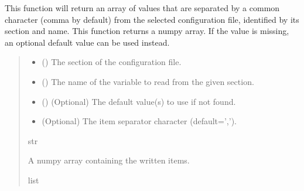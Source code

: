 \documentclass[letterpaper,10pt,english]{sphinxmanual}
\begin{document}
\begin{fulllineitems}
\begin{fulllineitems}
This function will return an array of values that are separated by a
common character (comma by default) from the selected configuration
file, identified by its section and name. This function returns a
numpy array. If the value is missing, an optional default value can
be used instead.
\begin{quote}\begin{description}
\begin{itemize}
\item {} 
\sphinxAtStartPar
{} () \textendash{} The section of the configuration file.

\item {} 
\sphinxAtStartPar
{} () \textendash{} The name of the variable to read from the given section.

\item {} 
\sphinxAtStartPar
{} () \textendash{} (Optional) The default value(s) to use if not found.

\item {} 
\sphinxAtStartPar
{} \textendash{} (Optional) The item separator character (default=’,’).

\end{itemize}

\sphinxAtStartPar
str

\sphinxAtStartPar
A numpy array containing the written items.

\sphinxAtStartPar
list

\end{description}\end{quote}

\end{fulllineitems}



\end{fulllineitems}
\end{document}
